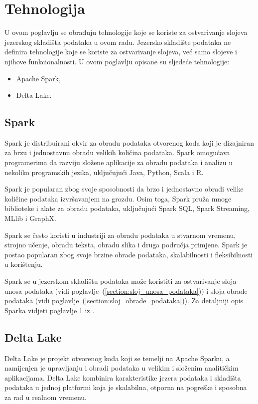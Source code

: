 \chapter{Tehnologija} \label{chapter:tehnologija}
U ovom poglavlju se obrađuju tehnologije koje se koriste za ostvarivanje slojeva
jezerskog skladišta podataka u ovom radu. Jezersko skladište podataka ne
definira tehnologije koje se koriste za ostvarivanje slojeva, već samo slojeve i
njihove funkcionalnosti. U ovom poglavlju opisane su sljedeće tehnologije:
\begin{itemize}
    \item Apache Spark,
    \item Delta Lake.    
\end{itemize}

\section{Spark} \label{section:spark}
Spark je distribuirani okvir za obradu podataka otvorenog koda koji je
dizajniran za brzu i jednostavnu obradu velikih količina podataka. Spark
omogućava programerima da razviju složene aplikacije za obradu podataka i
analizu u nekoliko programskih jezika, uključujući Java, Python, Scala i R.

Spark je popularan zbog svoje sposobnosti da brzo i jednostavno obradi velike
količine podataka izvršavanjem na grozdu. Osim toga, Spark pruža mnoge
biblioteke i alate za obradu podataka, uključujući Spark SQL, Spark Streaming,
MLlib i GraphX.

Spark se često koristi u industriji za obradu podataka u stvarnom vremenu,
strojno učenje, obradu teksta, obradu slika i druga područja primjene. Spark je
postao popularan zbog svoje brzine obrade podataka, skalabilnosti i
fleksibilnosti u korištenju. 

Spark se u jezerskom skladištu podataka može koristiti za ostvarivanje sloja
unosa podataka (vidi poglavlje~(\ref{section:sloj_unosa_podataka})) i sloja
obrade podataka (vidi poglavlje~(\ref{section:sloj_obrade_podataka})). Za
detaljniji opis Sparka vidjeti poglavlje 1 iz \cite{spark2020}.

\section{Delta Lake} \label{section:delta_lake}
Delta Lake je projekt otvorenog koda koji se temelji na Apache Sparku, a
namijenjen je upravljanju i obradi podataka u velikim i složenim analitičkim
aplikacijama. Delta Lake kombinira karakteristike jezera podataka i skladišta
podataka u jednoj platformi koja je skalabilna, otporna na
pogreške i sposobna za rad u realnom vremenu.

